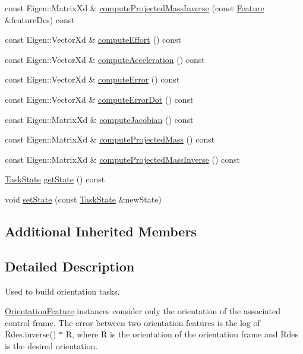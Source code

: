 \begin{DoxyCompactItemize}
\item 
const Eigen\+::\+Matrix\+Xd \& \hyperlink{classocra_1_1OrientationFeature_ae5b32433e22fcea36c62b13811f8b5a0}{compute\+Projected\+Mass\+Inverse} (const \hyperlink{classocra_1_1Feature}{Feature} \&feature\+Des) const
\item 
const Eigen\+::\+Vector\+Xd \& \hyperlink{classocra_1_1OrientationFeature_aa2d2bee82d7c9bef9f565e328204a2f2}{compute\+Effort} () const
\item 
const Eigen\+::\+Vector\+Xd \& \hyperlink{classocra_1_1OrientationFeature_a948340f06a913d3c56fb306f65c3ad81}{compute\+Acceleration} () const
\item 
const Eigen\+::\+Vector\+Xd \& \hyperlink{classocra_1_1OrientationFeature_a0663495ff0bd6a9b01330ce4372b56ab}{compute\+Error} () const
\item 
const Eigen\+::\+Vector\+Xd \& \hyperlink{classocra_1_1OrientationFeature_abf35648fec0b8744710cfd9da704cbbf}{compute\+Error\+Dot} () const
\item 
const Eigen\+::\+Matrix\+Xd \& \hyperlink{classocra_1_1OrientationFeature_abcbc478b32843cc055c3b7002ce91e7c}{compute\+Jacobian} () const
\item 
const Eigen\+::\+Matrix\+Xd \& \hyperlink{classocra_1_1OrientationFeature_a6db043f4cce0767fe530c2e14aa9f48a}{compute\+Projected\+Mass} () const
\item 
const Eigen\+::\+Matrix\+Xd \& \hyperlink{classocra_1_1OrientationFeature_a56caa1399bd0f474a91da570c8be57bb}{compute\+Projected\+Mass\+Inverse} () const
\item 
\hyperlink{classocra_1_1TaskState}{Task\+State} \hyperlink{classocra_1_1OrientationFeature_a586d036d6676d9ff17d33db2dcc11cae}{get\+State} () const
\item 
void \hyperlink{classocra_1_1OrientationFeature_a2a3b8eb5334d6dcd8f3b2fc40aac46ad}{set\+State} (const \hyperlink{classocra_1_1TaskState}{Task\+State} \&new\+State)
\end{DoxyCompactItemize}
\subsection*{Additional Inherited Members}


\subsection{Detailed Description}
Used to build orientation tasks. 

\hyperlink{classocra_1_1OrientationFeature}{Orientation\+Feature} instances consider only the orientation of the associated control frame. The error between two orientation features is the log of Rdes.\+inverse() $\ast$ R, where R is the orientation of the orientation frame and Rdes is the desired orientation. 


